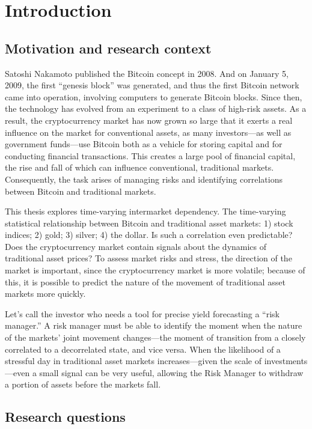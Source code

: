 \section{Introduction}

\subsection{Motivation and research context}

Satoshi Nakamoto published the Bitcoin concept in 2008. And on January 5, 2009, the first ``genesis block'' was generated, and thus the first Bitcoin network came into operation, involving computers to generate Bitcoin blocks. Since then, the technology has evolved from an experiment to a class of high-risk assets. As a result, the cryptocurrency market has now grown so large that it exerts a real influence on the market for conventional assets, as many investors—as well as government funds—use Bitcoin both as a vehicle for storing capital and for conducting financial transactions. This creates a large pool of financial capital, the rise and fall of which can influence conventional, traditional markets. Consequently, the task arises of managing risks and identifying correlations between Bitcoin and traditional markets.

This thesis explores time-varying intermarket dependency. The time-varying statistical relationship between Bitcoin and traditional asset markets:
1) stock indices;
2) gold;
3) silver;
4) the dollar.
Is such a correlation even predictable? Does the cryptocurrency market contain signals about the dynamics of traditional asset prices? To assess market risks and stress, the direction of the market is important, since the cryptocurrency market is more volatile; because of this, it is possible to predict the nature of the movement of traditional asset markets more quickly.

Let's call the investor who needs a tool for precise yield forecasting a ``risk manager.'' A risk manager must be able to identify the moment when the nature of the markets' joint movement changes—the moment of transition from a closely correlated to a decorrelated state, and vice versa. When the likelihood of a stressful day in traditional asset markets increases—given the scale of investments—even a small signal can be very useful, allowing the Risk Manager to withdraw a portion of assets before the markets fall.

\subsection{Research questions}

